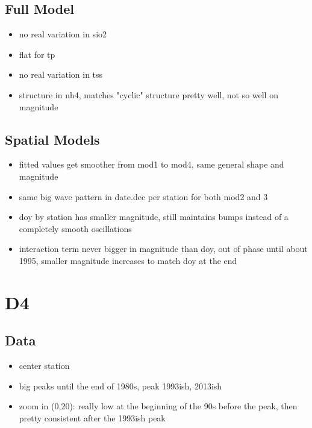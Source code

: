 \documentclass[12pt]{amsart}
\begin{document}
\subsection{Full Model}
\begin{itemize}
\item no real variation in sio2
\item flat for tp
\item no real variation in tss
\item structure in nh4, matches "cyclic" structure pretty well, not so well on magnitude
\end{itemize}

\subsection{Spatial Models}

\begin{itemize}
\item fitted values get smoother from mod1 to mod4, same general shape and magnitude
\item same big wave pattern in date.dec per station for both mod2 and 3
\item doy by station has smaller magnitude, still maintains bumps instead of a completely smooth oscillations
\item interaction term never bigger in magnitude than doy, out of phase until about 1995, smaller magnitude increases to match doy at the end 
\end{itemize}



\section{D4}
\subsection{Data}
\begin{itemize}
\item center station
\item big peaks until the end of 1980s, peak 1993ish, 2013ish
\item zoom in (0,20): really low at the beginning of the 90s before the peak, then pretty consistent after the 1993ish peak
\end{itemize}
\end{document}
